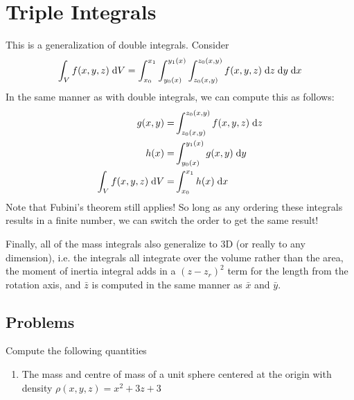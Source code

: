 \documentclass[letterpaper,11pt]{article}
\begin{document}
\section*{Triple Integrals}
This is a generalization of double integrals.
Consider
$$
\int_V f(x, y, z) \;\mathrm{d}V = \int_{x_0}^{x_1} \int_{y_0(x)}^{y_1(x)} \int_{z_0(x, y)}^{z_0(x, y)} f(x, y, z) \;\mathrm{d}z \;\mathrm{d}y \;\mathrm{d}x
$$
In the same manner as with double integrals, we can compute this as follows:
\begin{align*}
  g(x, y) = &\int_{z_0(x, y)}^{z_0(x, y)} f(x, y, z) \;\mathrm{d}z\\
  h(x) = &\int_{y_0(x)}^{y_1(x)} g(x, y) \;\mathrm{d}y\\
  \int_V f(x, y, z) \;\mathrm{d}V = &\int_{x_0}^{x_1} h(x) \;\mathrm{d}x
\end{align*}
Note that Fubini's theorem still applies!
So long as any ordering these integrals results in a finite number, we can switch the order to get the same result!

Finally, all of the mass integrals also generalize to 3D (or really to any dimension),
i.e. the integrals all integrate over the volume rather than the area,
the moment of inertia integral adds in a $(z - z_r)^2$ term for the length from the rotation axis,
and $\bar{z}$ is computed in the same manner as $\bar{x}$ and $\bar{y}$.
\subsection*{Problems}
Compute the following quantities
\begin{enumerate}
  \item The mass and centre of mass of a unit sphere centered at the origin with density $\rho(x, y, z) = x^2 + 3 z + 3$\\
    \newline
    \newline
\end{enumerate}
\end{document}
